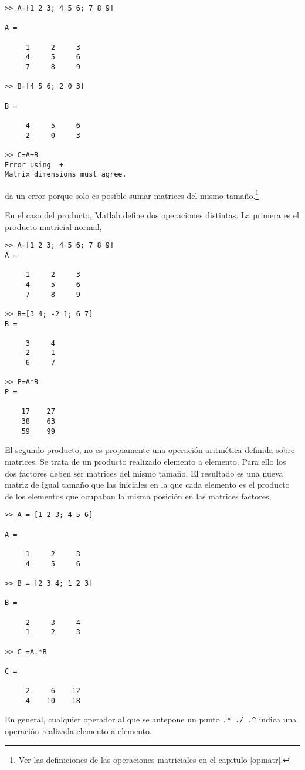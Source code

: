 \begin{verbatim}
>> A=[1 2 3; 4 5 6; 7 8 9]

A =

     1     2     3
     4     5     6
     7     8     9

>> B=[4 5 6; 2 0 3]

B =

     4     5     6
     2     0     3

>> C=A+B
Error using  + 
Matrix dimensions must agree.
\end{verbatim}
da un error porque solo es posible sumar matrices del mismo tamaño.\footnote{Ver las definiciones de las operaciones matriciales en el capitulo \ref{opmatr}.}

En el caso del producto, Matlab define dos operaciones distintas. La primera es el producto matricial normal, 
\begin{verbatim}
>> A=[1 2 3; 4 5 6; 7 8 9]
A =

     1     2     3
     4     5     6
     7     8     9

>> B=[3 4; -2 1; 6 7]
B =

     3     4
    -2     1
     6     7

>> P=A*B
P =

    17    27
    38    63
    59    99
\end{verbatim}

El segundo producto, no es propiamente una operación aritmética definida sobre matrices. Se trata de un producto realizado elemento a elemento. Para ello los dos factores deben ser matrices del mismo tamaño. El resultado es una nueva matriz de igual tamaño que las iniciales en la que cada elemento es el producto de los elementos que ocupaban la misma posición en las matrices factores,

\begin{verbatim}
>> A = [1 2 3; 4 5 6]

A =

     1     2     3
     4     5     6

>> B = [2 3 4; 1 2 3]

B =

     2     3     4
     1     2     3

>> C =A.*B

C =

     2     6    12
     4    10    18
\end{verbatim}

En general, cualquier operador al que se antepone un punto \texttt{.* ./ .\^} indica una operación realizada elemento a elemento.

